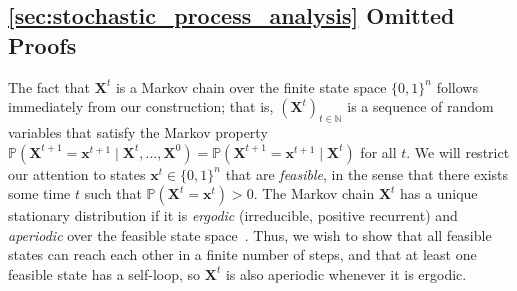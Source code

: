 \documentclass[mnsc,nonblindrev]{informs3}
\newcommand{\NN}{\mathbb{N}}
\renewcommand{\Pr}{\mathbb{P}}
\newcommand{\Xvec}{\mathbf{X}}
\newcommand{\xvec}{\mathbf{x}}
\renewenvironment{proof}[1][Proof]{%
  \par\noindent{\itshape #1.} \ignorespaces
}{%
  \hfill\Halmos\par
}
\begin{document}
\begin{APPENDICES}
\section{\cref{sec:stochastic_process_analysis} Omitted Proofs}
\label{app:stochastic_process_proofs}

\MarkovChainStationary*
\begin{proof}
    The fact that $\Xvec^t$ is a Markov chain over the finite state space $\{0,1\}^n$ follows immediately from our construction; that is, $(\Xvec^t)_{t \in \NN}$ is a sequence of random variables that satisfy the Markov property
    \(
        \Pr(\Xvec^{t+1}=\xvec^{t+1} \mid \Xvec^{t},\dots,\Xvec^0)
        = \Pr(\Xvec^{t+1}=\xvec^{t+1} \mid \Xvec^{t})
    \)
    for all $t$.
    We will restrict our attention to states $\xvec^t\in\{0,1\}^n$ that are \emph{feasible}, in the sense that there exists some time $t$ such that $\Pr(\Xvec^t=\xvec^t)>0$.
    The Markov chain $\Xvec^t$ has a unique stationary distribution if it is \emph{ergodic} (irreducible, positive recurrent) and \emph{aperiodic} over the feasible state space~\citep{resnick2013adventures}.  Thus, we wish to show that all feasible states can reach each other in a finite number of steps, and that at least one feasible state has a self-loop, so $\Xvec^t$ is also aperiodic whenever it is ergodic.


\end{proof}
\end{APPENDICES}
\end{document}
